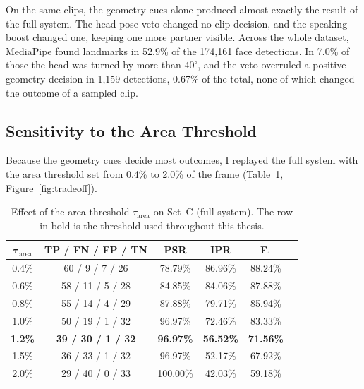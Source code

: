 On the same clips, the geometry cues alone produced almost exactly the result of the full
system. The head-pose veto changed no clip decision, and the speaking boost changed one,
keeping one more partner visible. Across the whole dataset, MediaPipe found landmarks in
52.9\% of the 174,161 face detections. In 7.0\% of those the head was turned by more than
$40^\circ$, and the veto overruled a positive geometry decision in 1,159 detections, 0.67\%
of the total, none of which changed the outcome of a sampled clip.

\subsection{Sensitivity to the Area Threshold}
\label{sec:res_sweep}

Because the geometry cues decide most outcomes, I replayed the full system with the area
threshold set from 0.4\% to 2.0\% of the frame (Table~\ref{tab:sweep},
Figure~\ref{fig:tradeoff}).

\begin{table}[htbp]
\begin{singlespace}
\centering
\caption{Effect of the area threshold $\tau_{\mathrm{area}}$ on Set~C (full system). The
row in bold is the threshold used throughout this thesis.}
\label{tab:sweep}
\renewcommand{\arraystretch}{1.3}
\begin{tabular}{@{}cccccc@{}}
\toprule
$\boldsymbol{\tau_{\mathrm{area}}}$ & \textbf{TP / FN / FP / TN} & \textbf{PSR} & \textbf{IPR} & \textbf{F$_1$} \\
\midrule
0.4\% & 60 / 9 / 7 / 26  & 78.79\%  & 86.96\% & 88.24\% \\
0.6\% & 58 / 11 / 5 / 28 & 84.85\%  & 84.06\% & 87.88\% \\
0.8\% & 55 / 14 / 4 / 29 & 87.88\%  & 79.71\% & 85.94\% \\
1.0\% & 50 / 19 / 1 / 32 & 96.97\%  & 72.46\% & 83.33\% \\
\textbf{1.2\%} & \textbf{39 / 30 / 1 / 32} & \textbf{96.97\%} & \textbf{56.52\%} & \textbf{71.56\%} \\
1.5\% & 36 / 33 / 1 / 32 & 96.97\%  & 52.17\% & 67.92\% \\
2.0\% & 29 / 40 / 0 / 33 & 100.00\% & 42.03\% & 59.18\% \\
\bottomrule
\end{tabular}
\end{singlespace}
\end{table}

